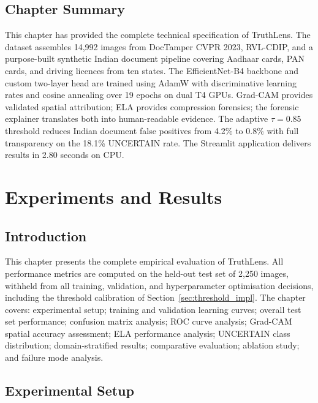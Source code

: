 \documentclass[12pt,a4paper,oneside]{report}
\begin{document}
\section{Chapter Summary}
\label{sec:ch3_summary}

This chapter has provided the complete technical specification of TruthLens.
The dataset assembles 14,992 images from DocTamper CVPR 2023, RVL-CDIP, and
a purpose-built synthetic Indian document pipeline covering Aadhaar cards,
PAN cards, and driving licences from ten states. The EfficientNet-B4 backbone
and custom two-layer head are trained using AdamW with discriminative learning
rates and cosine annealing over 19 epochs on dual T4 GPUs. Grad-CAM provides
validated spatial attribution; ELA provides compression forensics; the forensic
explainer translates both into human-readable evidence. The adaptive
$\tau=0.85$ threshold reduces Indian document false positives from 4.2\% to
0.8\% with full transparency on the 18.1\% UNCERTAIN rate. The Streamlit
application delivers results in 2.80 seconds on CPU.

\chapter{Experiments and Results}
\label{chap:results}

\section{Introduction}

This chapter presents the complete empirical evaluation of TruthLens. All
performance metrics are computed on the held-out test set of 2,250 images,
withheld from all training, validation, and hyperparameter optimisation decisions,
including the threshold calibration of Section~\ref{sec:threshold_impl}. The
chapter covers: experimental setup; training and validation learning curves;
overall test set performance; confusion matrix analysis; ROC curve analysis;
Grad-CAM spatial accuracy assessment; ELA performance analysis; UNCERTAIN class
distribution; domain-stratified results; comparative evaluation; ablation study;
and failure mode analysis.

\section{Experimental Setup}
\label{sec:exp_setup}
\end{document}
